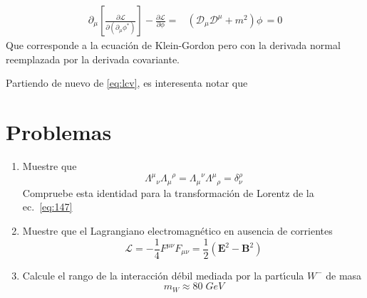 \begin{align}
  \partial_{\mu} \left[ \frac{\partial \mathcal{L}}{\partial \left( \partial_{\mu}\phi^{*} \right)} \right]-\frac{\partial \mathcal{L}}{\partial \phi}=&
 \left(\mathcal{D}_{\mu}\mathcal{D}^{\mu}+m^2  \right)\phi\,=0
\end{align}
Que corresponde a la ecuación de Klein-Gordon pero con la derivada normal reemplazada por la derivada covariante.

Partiendo de nuevo de \ref{eq:lcv}, es interesenta notar que


\section{Problemas}
\label{sec:problemas2}
\renewcommand{\labelenumi}{\thechapter.\theenumi} %

\begin{enumerate} %
\item Muestre que
  \begin{equation*}
    {\Lambda^{\mu}}_{\nu}{\Lambda_\mu}^{\rho}={\Lambda_{\mu}}^{\nu}{\Lambda^{\mu}}_{\rho}=\delta^\rho_\nu
  \end{equation*}
Compruebe esta identidad para la transformaci\'on de Lorentz de la ec.~\eqref{eq:147}
\label{item:pch2.1} %

\item Muestre que el Lagrangiano electromagn\'etico en ausencia de corrientes
  \begin{equation}
    \mathcal{L}=-\frac{1}{4}F^{\mu\nu}F_{\mu\nu}=\frac{1}{2}\left(\mathbf{E}^2-\mathbf{B}^2\right)
  \end{equation}
\label{item:pch2.2} %

\item Calcule el rango de la interacci\'on d\'ebil mediada por la part\'\i cula $W^{-}$ de masa
  \begin{equation}
    m_W\approx80\;GeV
  \end{equation}
\label{item:pch2.3} %
\end{enumerate} %
\renewcommand{\labelenumi}{\theenumi} %






